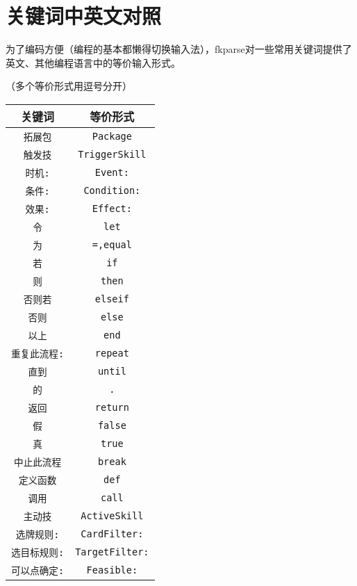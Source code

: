 \chapter{关键词中英文对照}

为了编码方便（编程的基本都懒得切换输入法），fkparse对一些常用关键词提供了英文、其他编程语言中的等价输入形式。

（多个等价形式用逗号分开）

\begin{center}
\begin{longtable}{|c|c|}
\hline \textbf{关键词} & \textbf{等价形式} \\
\hline \verb|拓展包| & \verb|Package| \\
\hline \verb|触发技| & \verb|TriggerSkill| \\
\hline \verb|时机:| & \verb|Event:| \\
\hline \verb|条件:| & \verb|Condition:| \\
\hline \verb|效果:| & \verb|Effect:| \\
\hline \verb|令| & \verb|let| \\
\hline \verb|为| & \verb|=,equal| \\
\hline \verb|若| & \verb|if| \\
\hline \verb|则| & \verb|then| \\
\hline \verb|否则若| & \verb|elseif| \\
\hline \verb|否则| & \verb|else| \\
\hline \verb|以上| & \verb|end| \\
\hline \verb|重复此流程:| & \verb|repeat| \\
\hline \verb|直到| & \verb|until| \\
\hline \verb|的| & \verb|.| \\
\hline \verb|返回| & \verb|return| \\
\hline \verb|假| & \verb|false| \\
\hline \verb|真| & \verb|true| \\
\hline \verb|中止此流程| & \verb|break| \\
\hline \verb|定义函数| & \verb|def| \\
\hline \verb|调用| & \verb|call| \\
\hline \verb|主动技| & \verb|ActiveSkill| \\
\hline \verb|选牌规则:| & \verb|CardFilter:| \\
\hline \verb|选目标规则:| & \verb|TargetFilter:| \\
\hline \verb|可以点确定:| & \verb|Feasible:| \\

\end{longtable}
\end{center}
